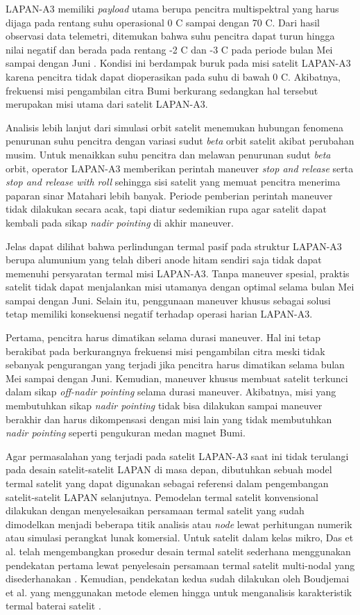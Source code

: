 LAPAN-A3 memiliki \textit{payload} utama berupa pencitra multispektral yang
harus dijaga pada rentang suhu operasional 0 \degree C sampai dengan 70 \degree
C. Dari hasil observasi data telemetri, ditemukan bahwa suhu pencitra dapat
turun hingga nilai negatif dan berada pada rentang -2 \degree C dan -3 \degree
C pada periode bulan Mei sampai dengan Juni \cite{ribah2019}. Kondisi ini
berdampak buruk pada misi satelit LAPAN-A3 karena pencitra tidak dapat
dioperasikan pada suhu di bawah 0 \degree C. Akibatnya, frekuensi misi
pengambilan citra Bumi berkurang sedangkan hal tersebut merupakan misi utama
dari satelit LAPAN-A3.

Analisis lebih lanjut dari simulasi orbit satelit menemukan hubungan fenomena
penurunan suhu pencitra dengan variasi sudut \textit{beta} orbit satelit akibat
perubahan musim. Untuk menaikkan suhu pencitra dan melawan penurunan sudut
\textit{beta} orbit, operator LAPAN-A3 memberikan perintah maneuver
\textit{stop and release} serta \textit{stop and release with roll} sehingga
sisi satelit yang memuat pencitra menerima paparan sinar Matahari lebih banyak.
Periode pemberian perintah maneuver tidak dilakukan secara acak, tapi diatur
sedemikian rupa agar satelit dapat kembali pada sikap \textit{nadir pointing}
di akhir maneuver.

Jelas dapat dilihat bahwa perlindungan termal pasif pada struktur LAPAN-A3
berupa alumunium yang telah diberi anode hitam sendiri saja tidak dapat
memenuhi persyaratan termal misi LAPAN-A3. Tanpa maneuver spesial, praktis
satelit tidak dapat menjalankan misi utamanya dengan optimal selama bulan Mei
sampai dengan Juni. Selain itu, penggunaan maneuver khusus sebagai solusi tetap
memiliki konsekuensi negatif terhadap operasi harian LAPAN-A3. 

Pertama, pencitra harus dimatikan selama durasi maneuver. Hal ini tetap
berakibat pada berkurangnya frekuensi misi pengambilan citra meski tidak
sebanyak pengurangan yang terjadi jika pencitra harus dimatikan selama bulan
Mei sampai dengan Juni. Kemudian, maneuver khusus membuat satelit terkunci
dalam sikap \textit{off-nadir pointing} selama durasi maneuver. Akibatnya, misi
yang membutuhkan sikap \textit{nadir pointing} tidak bisa dilakukan sampai
maneuver berakhir dan harus dikompensasi dengan misi lain yang tidak
membutuhkan \textit{nadir pointing} seperti pengukuran medan magnet Bumi.

Agar permasalahan yang terjadi pada satelit LAPAN-A3 saat ini tidak terulangi
pada desain satelit-satelit LAPAN di masa depan, dibutuhkan sebuah model termal
satelit yang dapat digunakan sebagai referensi dalam pengembangan
satelit-satelit LAPAN selanjutnya. Pemodelan termal satelit konvensional
dilakukan dengan menyelesaikan persamaan termal satelit yang sudah dimodelkan
menjadi beberapa titik analisis atau \textit{node} lewat perhitungan numerik
atau simulasi perangkat lunak komersial. Untuk satelit dalam kelas mikro, Das
et al. telah mengembangkan prosedur desain termal satelit sederhana menggunakan
pendekatan pertama lewat penyelesain persamaan termal satelit multi-nodal yang
disederhanakan \cite{das}. Kemudian, pendekatan kedua sudah dilakukan oleh
Boudjemai et al. yang menggunakan metode elemen hingga untuk menganalisis
karakteristik termal baterai satelit \cite{boudjemai2015}.

